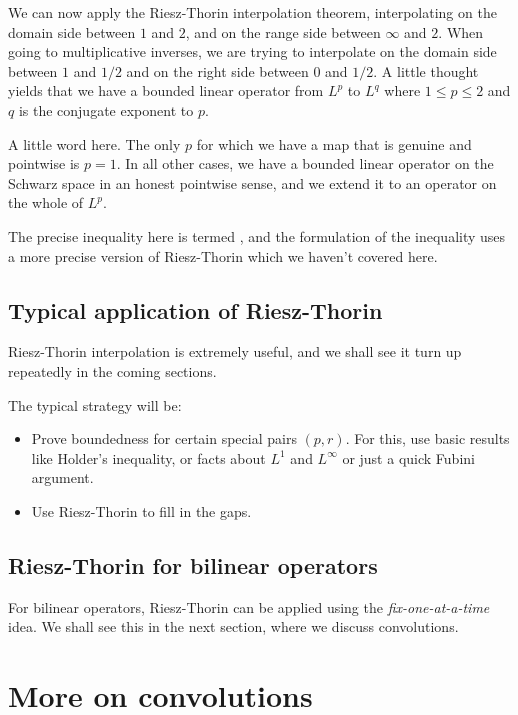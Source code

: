 \documentclass[a4paper]{amsart}
\begin{document}
We can now apply the Riesz-Thorin interpolation theorem, interpolating
on the domain side between $1$ and $2$, and on the range side between
$\infty$ and $2$. When going to multiplicative inverses, we are trying
to interpolate on the domain side between $1$ and $1/2$ and on the
right side between $0$ and $1/2$. A little thought yields that we have
a bounded linear operator from $L^p$ to $L^q$ where $1 \le p \le 2$
and $q$ is the conjugate exponent to $p$.

A little word here. The only $p$ for which we have a map that is
genuine and pointwise is $p = 1$. In all other cases, we have a
bounded linear operator on the Schwarz space in an honest pointwise
sense, and we extend it to an operator on the whole of $L^p$.

The precise inequality here is termed , and the formulation of the inequality uses a more
precise version of Riesz-Thorin which we haven't covered here.

\subsection{Typical application of Riesz-Thorin}

Riesz-Thorin interpolation is extremely useful, and we shall see it
turn up repeatedly in the coming sections.

The typical strategy will be:

\begin{itemize}

\item Prove boundedness for certain special pairs $(p,r)$. For this,
  use basic results like Holder's inequality, or facts about $L^1$ and
  $L^\infty$ or just a quick Fubini argument.

\item Use Riesz-Thorin to fill in the gaps.

\end{itemize}

\subsection{Riesz-Thorin for bilinear operators}

For bilinear operators, Riesz-Thorin can be applied using the {\em
  fix-one-at-a-time} idea. We shall see this in the next section,
where we discuss convolutions.

\section{More on convolutions}
\end{document}
